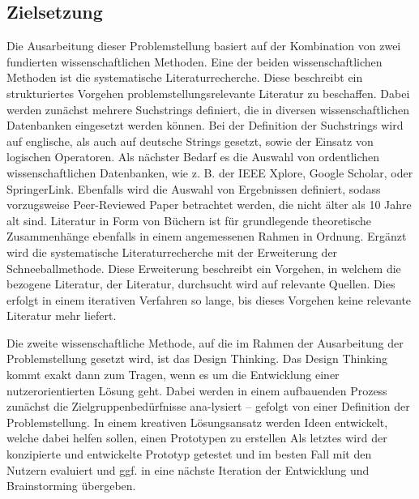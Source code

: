 \subsection{Zielsetzung}
Die Ausarbeitung dieser Problemstellung basiert auf der Kombination von zwei fundierten wissenschaftlichen Methoden.
Eine der beiden wissenschaftlichen Methoden ist die systematische Literaturrecherche.
Diese beschreibt ein strukturiertes Vorgehen problemstellungsrelevante Literatur zu beschaffen.
Dabei werden zunächst mehrere Suchstrings definiert, die in diversen wissenschaftlichen Datenbanken eingesetzt werden können.
Bei der Definition der Suchstrings wird auf englische, als auch auf deutsche Strings gesetzt, sowie der Einsatz von logischen Operatoren.
Als nächster Bedarf es die Auswahl von ordentlichen wissenschaftlichen Datenbanken, wie z. B. der IEEE Xplore, Google Scholar, oder SpringerLink.
Ebenfalls wird die Auswahl von Ergebnissen definiert, sodass vorzugsweise Peer-Reviewed Paper betrachtet werden, die nicht älter als 10 Jahre alt sind.
Literatur in Form von Büchern ist für grundlegende theoretische Zusammenhänge ebenfalls in einem angemessenen Rahmen in Ordnung.
Ergänzt wird die systematische Literaturrecherche mit der Erweiterung der Schneeballmethode.
Diese Erweiterung beschreibt ein Vorgehen, in welchem die bezogene Literatur, der Literatur, durchsucht wird auf relevante Quellen.
Dies erfolgt in einem iterativen Verfahren so lange, bis dieses Vorgehen keine relevante Literatur mehr liefert.

Die zweite wissenschaftliche Methode, auf die im Rahmen der Ausarbeitung der Problemstellung gesetzt wird, ist das Design Thinking.
Das Design Thinking kommt exakt dann zum Tragen, wenn es um die Entwicklung einer nutzerorientierten Lösung geht.
Dabei werden in einem aufbauenden Prozess zunächst die Zielgruppenbedürfnisse ana-lysiert – gefolgt von einer Definition der Problemstellung.
In einem kreativen Lösungsansatz werden Ideen entwickelt, welche dabei helfen sollen, einen Prototypen zu erstellen Als letztes wird der konzipierte und entwickelte Prototyp getestet und im besten Fall mit den Nutzern evaluiert und ggf. in eine nächste Iteration der Entwicklung und Brainstorming übergeben.
